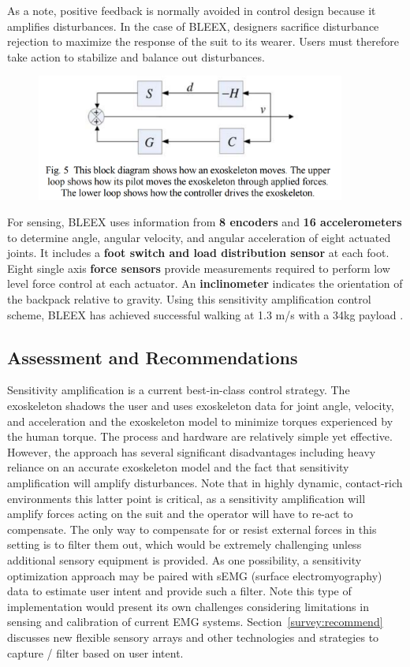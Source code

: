 \begin{refsection}
As a note, positive feedback is normally avoided in control design because it amplifies disturbances.  In the case of BLEEX, designers sacrifice disturbance rejection to maximize the response of the suit to its wearer.  Users must therefore take action to stabilize and balance out disturbances.

\begin{figure}[ht]
  \centering
  \includegraphics[width=4.0in]{exos/figs/bleex_control_diag_3.png}
\end{figure}

For sensing, BLEEX uses information from \textbf{8 encoders} and \textbf{16 accelerometers} to determine angle, angular velocity, and angular acceleration of eight actuated joints. It includes a \textbf{foot switch and load distribution sensor} at each foot. Eight single axis \textbf{force sensors} provide measurements required to perform low level force control at each actuator. An \textbf{inclinometer} indicates the orientation of the backpack relative to gravity. Using this sensitivity amplification control scheme, BLEEX has achieved successful walking at 1.3 m/s with a 34kg payload \cite{sesitivityAmpPaper2005}.

\subsection{Assessment and Recommendations}

Sensitivity amplification is a current best-in-class control strategy.  The exoskeleton shadows the user and uses exoskeleton data for joint angle, velocity, and acceleration and the exoskeleton model to minimize torques experienced by the human torque.  The process and hardware are relatively simple yet effective.   However, the approach has several significant disadvantages including heavy reliance on an accurate exoskeleton model and the fact that sensitivity amplification will amplify disturbances.  Note that in highly dynamic, contact-rich environments this latter point is critical, as a sensitivity amplification will amplify forces acting on the suit and the operator will have to re-act to compensate.  The only way to compensate for or resist external forces in this setting is to filter them out, which would be extremely challenging unless additional sensory equipment is provided.  
As one possibility, a sensitivity optimization approach may be paired with sEMG (surface electromyography) data to estimate user intent and provide such a filter.  Note this type of implementation would present its own challenges considering limitations in sensing and calibration of current EMG systems. Section~\ref{survey:recommend} discusses new flexible sensory arrays and other technologies and strategies to capture / filter based on user intent.  


\end{refsection}
